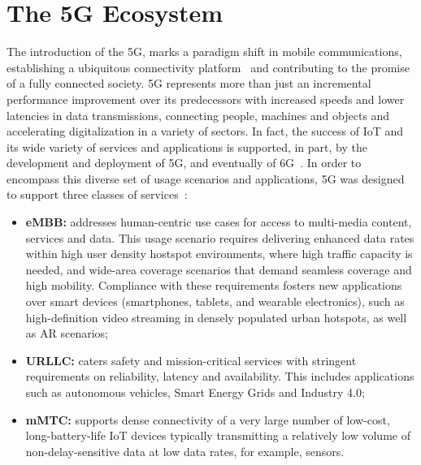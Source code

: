 \section{The 5G Ecosystem} \label{sota:5gecosystem}

The introduction of the \acf{5G}, marks a paradigm shift in mobile communications, establishing a ubiquitous connectivity platform~\cite{tech-leadership-and-5g-patent-portfolios} and contributing to the promise of a fully connected society. \acs{5G} represents more than just an incremental performance improvement over its predecessors with increased speeds and lower latencies in data transmissions, connecting people, machines and objects and accelerating digitalization in a variety of sectors. In fact, the success of \ac{IoT} and its wide variety of services and applications is supported, in part, by the development and deployment of \acs{5G}, and eventually of \acs{6G}~\cite{future-of-5g-beyond}. In order to encompass this diverse set of usage scenarios and applications, \acs{5G} was designed to support three classes of services~\citep{imtVision2015, roadTowards6G}:
\begin{itemize}
    \item \textbf{\ac{eMBB}:} addresses human-centric use cases for access to multi-media content, services and data. This usage scenario requires delivering enhanced data rates within high user density hostspot environments, where high traffic capacity is needed, and wide-area coverage scenarios that demand seamless coverage and high mobility. Compliance with these requirements fosters new applications over smart devices (smartphones, tablets, and wearable electronics), such as high-definition video streaming in densely populated urban hotspots, as well as \ac{AR} scenarios;
    \item \textbf{\ac{URLLC}:} caters safety and mission-critical services with stringent requirements on reliability, latency and availability. This includes applications such as autonomous vehicles, Smart Energy Grids and Industry 4.0;
    \item \textbf{\ac{mMTC}:} supports dense connectivity of a very large number of low-cost, long-battery-life \ac{IoT} devices typically transmitting a relatively low volume of non-delay-sensitive data at low data rates, for example, sensors.
\end{itemize}

